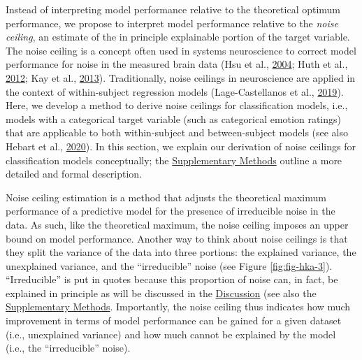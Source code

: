 \documentclass[11pt,american,a4paper,oneside,]{memoir} %
\begin{document}
Instead of interpreting model performance relative to the theoretical optimum performance, we propose to interpret model performance relative to the \emph{noise ceiling}, an estimate of the in principle explainable portion of the target variable. The noise ceiling is a concept often used in systems neuroscience to correct model performance for noise in the measured brain data (Hsu et al., \protect\hyperlink{ref-Hsu2004-hs}{2004}; Huth et al., \protect\hyperlink{ref-Huth2012-yc}{2012}; Kay et al., \protect\hyperlink{ref-Kay2013-ch}{2013}). Traditionally, noise ceilings in neuroscience are applied in the context of within-subject regression models (Lage-Castellanos et al., \protect\hyperlink{ref-lage2019methods}{2019}). Here, we develop a method to derive noise ceilings for classification models, i.e., models with a categorical target variable (such as categorical emotion ratings) that are applicable to both within-subject and between-subject models (see also Hebart et al., \protect\hyperlink{ref-Hebart2020-wp}{2020}). In this section, we explain our derivation of noise ceilings for classification models conceptually; the \protect\hyperlink{hypothesis-kernel-analysis-supplement}{Supplementary Methods} outline a more detailed and formal description.

Noise ceiling estimation is a method that adjusts the theoretical maximum performance of a predictive model for the presence of irreducible noise in the data. As such, like the theoretical maximum, the noise ceiling imposes an upper bound on model performance. Another way to think about noise ceilings is that they split the variance of the data into three portions: the explained variance, the unexplained variance, and the ``irreducible'' noise (see Figure \ref{fig:fig-hka-3}). ``Irreducible'' is put in quotes because this proportion of noise can, in fact, be explained in principle as will be discussed in the \protect\hyperlink{kha-discussion}{Discussion} (see also the \protect\hyperlink{hypothesis-kernel-analysis-supplement}{Supplementary Methods}. Importantly, the noise ceiling thus indicates how much improvement in terms of model performance can be gained for a given dataset (i.e., unexplained variance) and how much cannot be explained by the model (i.e., the ``irreducible'' noise).
\end{document}
